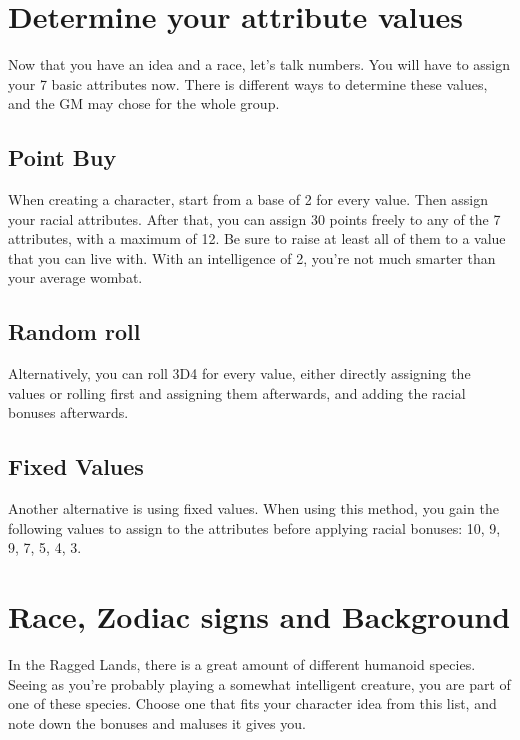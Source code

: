 \section{Determine your attribute values}

Now that you have an idea and a race, let’s talk numbers. You will have to assign your 7 basic attributes now. There is different ways to determine these values, and the GM may chose for the whole group.


\subsection{Point Buy}

When creating a character, start from a base of 2 for every value. Then assign your racial attributes. After that, you can assign 30 points freely to any of the 7 attributes, with a maximum of 12. Be sure to raise at least all of them to a value that you can live with. With an intelligence of 2, you’re not much smarter than your average wombat.


\subsection{Random roll}

Alternatively, you can roll 3D4 for every value, either directly assigning the values or rolling first and assigning them afterwards, and adding the racial bonuses afterwards. 



\subsection{Fixed Values}

Another alternative is using fixed values. When using this method, you gain the following values to assign to the attributes before applying racial bonuses: 10, 9, 9, 7, 5, 4, 3.



\section{Race, Zodiac signs and Background}

In the Ragged Lands, there is a great amount of different humanoid species. Seeing as you’re probably playing a somewhat intelligent creature, you are part of one of these species. Choose one that fits your character idea from this list, and note down the bonuses and maluses it gives you.

